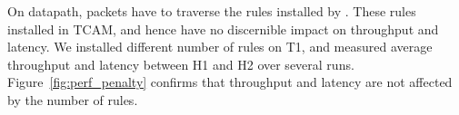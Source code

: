 On datapath, packets have to traverse the rules installed by \sysname{}.  These
rules installed in TCAM, and hence have no discernible impact on throughput and
latency. We installed different number of \sysname{} rules on T1, and measured
average throughput and latency between H1 and H2 over several runs.
Figure~\ref{fig:perf_penalty} confirms that throughput and latency are not
affected by the number of rules.


%	
%		
%		
%	
%	
%
